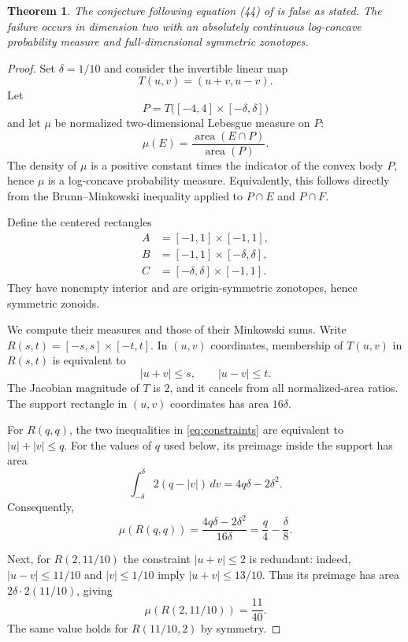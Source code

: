 \documentclass[11pt]{article}
\newtheorem{theorem}{Theorem}
\newcommand{\area}{\operatorname{area}}
\begin{document}
\begin{theorem}
The conjecture following equation \emph{(44)} of \cite{FLMZ} is false as
stated.  The failure occurs in dimension two with an absolutely continuous
log-concave probability measure and full-dimensional symmetric zonotopes.
\end{theorem}

\begin{proof}
Set $\delta=1/10$ and consider the invertible linear map
\[
 T(u,v)=(u+v,u-v).
\]
Let
\[
 P=T\bigl([-4,4]\times[-\delta,\delta]\bigr)
\]
and let $\mu$ be normalized two-dimensional Lebesgue measure on $P$:
\[
 \mu(E)=\frac{\area(E\cap P)}{\area(P)}.
\]
The density of $\mu$ is a positive constant times the indicator of the convex
body $P$, hence $\mu$ is a log-concave probability measure.  Equivalently,
this follows directly from the Brunn--Minkowski inequality applied to
$P\cap E$ and $P\cap F$.

Define the centered rectangles
\[
 \begin{split}
 A&=[-1,1]\times[-1,1],\\
 B&=[-1,1]\times[-\delta,\delta],\\
 C&=[-\delta,\delta]\times[-1,1].
 \end{split}
\]
They have nonempty interior and are origin-symmetric zonotopes, hence
symmetric zonoids.

We compute their measures and those of their Minkowski sums.  Write
$R(s,t)=[-s,s]\times[-t,t]$.  In $(u,v)$ coordinates, membership of $T(u,v)$
in $R(s,t)$ is equivalent to
\begin{equation}
 |u+v|\leq s,\qquad |u-v|\leq t.
 \label{eq:constraints}
\end{equation}
The Jacobian magnitude of $T$ is $2$, and it cancels from all normalized-area
ratios.  The support rectangle in $(u,v)$ coordinates has area $16\delta$.

For $R(q,q)$, the two inequalities in \eqref{eq:constraints} are equivalent
to $|u|+|v|\leq q$.  For the values of $q$ used below, its preimage inside the
support has area
\[
 \int_{-\delta}^{\delta}2(q-|v|)\,dv
   =4q\delta-2\delta^2.
\]
Consequently,
\begin{equation}
 \mu(R(q,q))=\frac{4q\delta-2\delta^2}{16\delta}
 =\frac q4-\frac\delta8.
 \label{eq:square-prob}
\end{equation}

Next, for $R(2,11/10)$ the constraint $|u+v|\leq2$ is redundant: indeed,
$|u-v|\leq11/10$ and $|v|\leq1/10$ imply
$|u+v|\leq13/10$.  Thus its preimage has area
$2\delta\cdot 2(11/10)$, giving
\begin{equation}
 \mu(R(2,11/10))=\frac{11}{40}.
 \label{eq:rectangle-prob}
\end{equation}
The same value holds for $R(11/10,2)$ by symmetry.


\end{proof}
\end{document}
